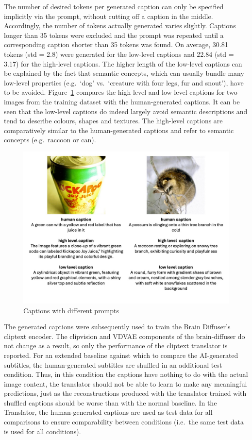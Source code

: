 The number of desired tokens per generated caption can only be specified implicitly via the prompt, without cutting off a caption in the middle. Accordingly, the number of tokens actually generated varies slightly. Captions longer than 35 tokens were excluded and the prompt was repeated until a corresponding caption shorter than 35 tokens was found. On average, 30.81 tokens (std = 2.8) were generated for the low-level captions and 22.84 (std = 3.17) for the high-level captions. The higher length of the low-level captions can be explained by the fact that semantic concepts, which can usually bundle many low-level properties (e.g.\ `dog' vs.\ `creature with four legs, fur and snout'), have to be avoided. Figure~\ref{fig:aicap_caption_samples} compares the high-level and low-level captions for two images from the training dataset with the human-generated captions. It can be seen that the low-level captions do indeed largely avoid semantic descriptions and tend to describe colours, shapes and textures. The high-level captions are comparatively similar to the human-generated captions and refer to semantic concepts (e.g.\ raccoon or can).

\begin{figure}[ht]
    \centering
    \includegraphics[width=1\textwidth]{plots/aicap_samples.jpeg}
    \caption{Captions with different prompts}\label{fig:aicap_caption_samples}
\end{figure}

The generated captions were subsequently used to train the Brain Diffuser's cliptext encoder. The clipvision and VDVAE components of the brain-diffuser do not change as a result, so only the performance of the cliptext translator is reported. For an extended baseline against which to compare the AI-generated subtitles, the human-generated subtitles are shuffled in an additional test condition. Thus, in this condition the captions have nothing to do with the actual image content, the translator should not be able to learn to make any meaningful predictions, just as the reconstructions produced with the translator trained with shuffled captions should be worse than with the normal baseline. In the Translator, the human-generated captions are used as test data for all comparisons to ensure comparability between conditions (i.e.\ the same test data is used for all conditions). 

